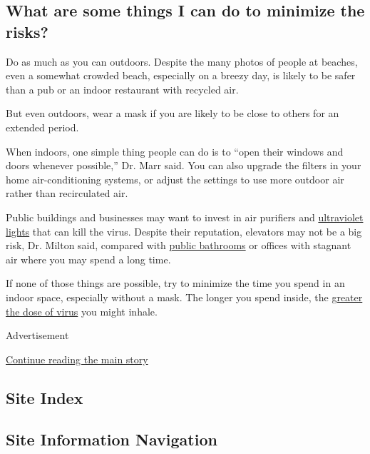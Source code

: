 \hypertarget{what-are-some-things-i-can-do-to-minimize-the-risks}{%
\subsection{What are some things I can do to minimize the
risks?}\label{what-are-some-things-i-can-do-to-minimize-the-risks}}

Do as much as you can outdoors. Despite the many photos of people at
beaches, even a somewhat crowded beach, especially on a breezy day, is
likely to be safer than a pub or an indoor restaurant with recycled air.

But even outdoors, wear a mask if you are likely to be close to others
for an extended period.

When indoors, one simple thing people can do is to ``open their windows
and doors whenever possible,'' Dr. Marr said. You can also upgrade the
filters in your home air-conditioning systems, or adjust the settings to
use more outdoor air rather than recirculated air.

Public buildings and businesses may want to invest in air purifiers and
\href{https://www.nytimes.com/2020/05/07/science/ultraviolet-light-coronavirus.html}{ultraviolet
lights} that can kill the virus. Despite their reputation, elevators may
not be a big risk, Dr. Milton said, compared with
\href{https://www.nytimes.com/2020/06/16/health/coronavirus-toilets-flushing.html}{public
bathrooms} or offices with stagnant air where you may spend a long time.

If none of those things are possible, try to minimize the time you spend
in an indoor space, especially without a mask. The longer you spend
inside, the
\href{https://www.nytimes.com/2020/05/29/health/coronavirus-transmission-dose.html}{greater
the dose of virus} you might inhale.

Advertisement

\protect\hyperlink{after-bottom}{Continue reading the main story}

\hypertarget{site-index}{%
\subsection{Site Index}\label{site-index}}

\hypertarget{site-information-navigation}{%
\subsection{Site Information
Navigation}\label{site-information-navigation}}

